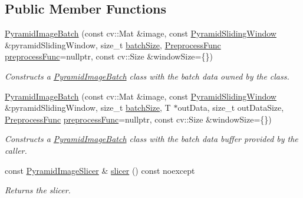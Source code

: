 \subsection*{Public Member Functions}
\begin{DoxyCompactItemize}
\item 
\hyperlink{group___imagery_module_ga5779bf3b610df23758e3f905b03f67ef}{Pyramid\+Image\+Batch} (const cv\+::\+Mat \&image, const \hyperlink{classdg_1_1deepcore_1_1imagery_1_1_pyramid_sliding_window}{Pyramid\+Sliding\+Window} \&pyramid\+Sliding\+Window, size\+\_\+t \hyperlink{group___imagery_module_gac5041040cb2396c35286067a6be232bc}{batch\+Size}, \hyperlink{namespacedg_1_1deepcore_1_1imagery_ad59888e5453be057c25213ce51df1439}{Preprocess\+Func} \hyperlink{group___imagery_module_gaf8e7737e6e0119039d2d755781450508}{preprocess\+Func}=nullptr, const cv\+::\+Size \&window\+Size=\{\})
\begin{DoxyCompactList}\small\item\em Constructs a \hyperlink{classdg_1_1deepcore_1_1imagery_1_1_pyramid_image_batch}{Pyramid\+Image\+Batch} class with the batch data owned by the class. \end{DoxyCompactList}\item 
\hyperlink{group___imagery_module_gab801036420ec3dd50de9d5c5e3ec4024}{Pyramid\+Image\+Batch} (const cv\+::\+Mat \&image, const \hyperlink{classdg_1_1deepcore_1_1imagery_1_1_pyramid_sliding_window}{Pyramid\+Sliding\+Window} \&pyramid\+Sliding\+Window, size\+\_\+t \hyperlink{group___imagery_module_gac5041040cb2396c35286067a6be232bc}{batch\+Size}, T $\ast$out\+Data, size\+\_\+t out\+Data\+Size, \hyperlink{namespacedg_1_1deepcore_1_1imagery_ad59888e5453be057c25213ce51df1439}{Preprocess\+Func} \hyperlink{group___imagery_module_gaf8e7737e6e0119039d2d755781450508}{preprocess\+Func}=nullptr, const cv\+::\+Size \&window\+Size=\{\})
\begin{DoxyCompactList}\small\item\em Constructs a \hyperlink{classdg_1_1deepcore_1_1imagery_1_1_pyramid_image_batch}{Pyramid\+Image\+Batch} class with the batch data buffer provided by the caller. \end{DoxyCompactList}\item 
const \hyperlink{classdg_1_1deepcore_1_1imagery_1_1_pyramid_image_slicer}{Pyramid\+Image\+Slicer} \& \hyperlink{group___imagery_module_ga8c11e57a0df4dcfabfd28eab4440b3d9}{slicer} () const noexcept
\begin{DoxyCompactList}\small\item\em Returns the slicer. \end{DoxyCompactList}\item 

\end{DoxyCompactItemize}
